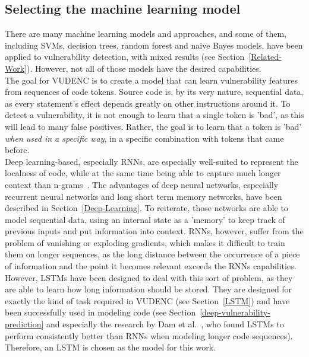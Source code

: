 \documentclass[
a4paper,
pagesize,
pdftex,
12pt,
ngerman,
fleqn,
final,
]{scrartcl}
\begin{document}
	\subsection{Selecting the machine learning model}
	There are many machine learning models and approaches, and some of them, including SVMs, decision trees, random forest and naive Bayes models, have been applied to vulnerability detection, with mixed results (see Section~\ref{Related-Work}). However, not all of those models have the desired capabilities.\\
	The goal for VUDENC is to create a model that can learn vulnerability features from sequences of code tokens. Source code is, by its very nature, sequential data, as every statement's effect depends greatly on other instructions around it. To detect a vulnerability, it is not enough to learn that a single token is 'bad', as this will lead to many false positives. Rather, the goal is to learn that a token is 'bad' \textit{when used in a specific way}, in a specific combination with tokens that came before.\\
	Deep learning-based, especially RNNs, are especially well-suited to represent the localness of code, while at the same time being able to capture much longer context than n-grams~\cite{Dam.2016}. The advantages of deep neural networks, especially recurrent neural networks and long short term memory networks, have been described in Section~\ref{Deep-Learning}. To reiterate, those networks are able to model sequential data, using an internal state as a 'memory' to keep track of previous inputs and put information into context. RNNs, however, suffer from the problem of vanishing or exploding gradients, which makes it difficult to train them on longer sequences, as the long distance between the occurrence of a piece of information and the point it becomes relevant exceeds the RNNs capabilities. However, LSTMs have been designed to deal with this sort of problem, as they are able to learn how long information should be stored. They are designed for exactly the kind of task required in VUDENC (see Section~\ref{LSTM}) and have been successfully used in modeling code (see Section~\ref{deep-vulnerability-prediction} and especially the research by Dam et al.~\cite{Dam.2016}, who found LSTMs to perform consistently better than RNNs when modeling longer code sequences). Therefore, an LSTM is chosen as the model for this work.
	
\end{document}
